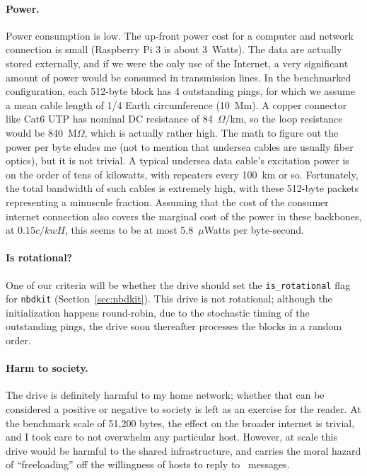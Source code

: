\documentclass[twocolumn]{article}
\begin{document}
\paragraph{Power.} Power consumption is low. The up-front power cost for
a computer and network connection is small (Raspberry Pi 3 is about
3~Watts). The data are actually stored externally, and if we were the
only use of the Internet, a very significant amount of power would be
consumed in transmission lines. In the benchmarked configuration, each
512-byte block has 4 outstanding pings, for which we assume a mean
cable length of 1/4 Earth circumference (10~Mm). A copper connector
like Cat6 UTP has nominal DC resistance of 84~$\Omega$/km, so the loop
resistance would be 840~M$\Omega$, which is actually rather high. The
math to figure out the power per byte eludes me (not to mention that
undersea cables are usually fiber optics), but it is not trivial. A
typical undersea data cable's excitation power is on the order of tens
of kilowatts, with repeaters every 100~km or so. Fortunately, the
total bandwidth of such cables is extremely high, with these 512-byte
packets representing a minuscule fraction. Assuming that the cost of
the consumer internet connection also covers the marginal cost of the
power in these backbones, at $0.15c/kwH$, this seems to be at most
5.8~$\mu$Watts per byte-second.


\paragraph{Is rotational?} One of our criteria will be whether the
drive should set the \verb+is_rotational+ flag for {\tt nbdkit}
(Section~\ref{sec:nbdkit}). This drive is not rotational; although the
initialization happens round-robin, due to the stochastic timing of the
outstanding pings, the drive soon thereafter processes the blocks in a
random order.

\paragraph{Harm to society.} The drive is definitely harmful to my
home network; whether that can be considered a positive or negative to
society is left as an exercise for the reader. At the benchmark scale
of 51,200 bytes, the effect on the broader internet is trivial, and I
took care to not overwhelm any particular host. However, at scale
this drive would be harmful to the shared infrastructure, and
carries the moral hazard of ``freeloading'' off the willingness of
hosts to reply to \icmpecho\ messages.
\end{document}

